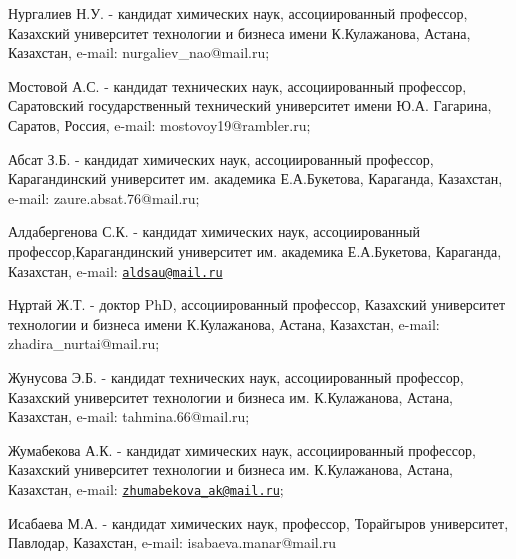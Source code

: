 Нургалиев Н.У. - кандидат химических наук, ассоциированный профессор,
Казахский университет технологии и бизнеса имени К.Кулажанова, Астана,
Казахстан, e-mail: nurgaliev\_nao@mail.ru;

Мостовой А.С. - кандидат технических наук, ассоциированный профессор,
Саратовский государственный технический университет имени Ю.А. Гагарина,
Саратов, Россия, e-mail: mostovoy19@rambler.ru;

Абсат З.Б. - кандидат химических наук, ассоциированный профессор,
Карагандинский университет им. академика Е.А.Букетова, Караганда,
Казахстан, e-mail: zaure.absat.76@mail.ru;

Алдабергенова С.К. - кандидат химических наук, ассоциированный
профессор,Карагандинский университет им. академика Е.А.Букетова,
Караганда, Казахстан, e-mail:
\href{mailto:aldsau@mail.ru}{\nolinkurl{aldsau@mail.ru}}

Нұртай Ж.Т. - доктор PhD, ассоциированный профессор, Казахский
университет технологии и бизнеса имени К.Кулажанова, Астана, Казахстан,
e-mail: zhadira\_nurtai@mail.ru;

Жунусова Э.Б. - кандидат технических наук, ассоциированный профессор,
Казахский университет технологии и бизнеса им. К.Кулажанова, Астана,
Казахстан, e-mail: tahmina.66@mail.ru;

Жумабекова А.К. - кандидат химических наук, ассоциированный профессор,
Казахский университет технологии и бизнеса им. К.Кулажанова, Астана,
Казахстан, e-mail:
\href{mailto:zhumabekova_ak@mail.ru}{\nolinkurl{zhumabekova\_ak@mail.ru}};

Исабаева М.А. - кандидат химических наук, профессор, Торайгыров
университет, Павлодар, Казахстан, e-mail: isabaeva.manar@mail.ru
